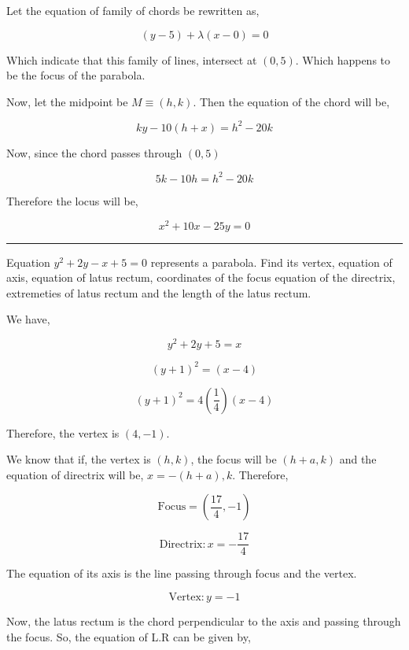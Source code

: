\documentclass[twocolumn]{article}
\begin{document}
\begin{CJK*}{UTF8}{gbsn}
Let the equation of family of chords be rewritten as, 

\[
    (y-5)+ \lambda (x - 0) = 0
\]

Which indicate that this family of lines, intersect at \((0, 5)\). Which happens to be the focus of the parabola.

\vspace*{0.1in}

Now, let the midpoint be \(M \equiv (h, k)\). Then the equation of the chord will be,  

\[
    ky - 10(h + x) = h^{2} - 20k
\]

Now, since the chord passes through \((0, 5)\) 

\[
    5k - 10h  = h^{2} - 20k
\]

Therefore the locus will be, 

\[
    \boxed{x^{2} + 10x - 25y = 0}
\]

\hrule 

\begin{question}
    Equation \(y^{2} + 2y - x + 5 = 0\)  represents a parabola. Find its vertex, equation of axis, equation of latus rectum, coordinates of the focus equation of the directrix, extremeties of latus rectum and the length of the latus rectum.  
\end{question}

We have, 

\[
    y^{2}  + 2y + 5 = x
\]

\[
    (y+  1)^{2} = (x-4)
\]

\[
    (y + 1)^{2} = 4 (\frac{1}{4}) (x-4)
\]

Therefore, the vertex is \(\boxed{(4, -1)}\). 

\vspace*{0.1in}

We know that if, the vertex is \((h, k)\), the focus will be \((h + a, k)\) and the equation of directrix will be, \(x = -(h+a), k\). Therefore, 

\[
    \text{Focus}  = \boxed{(\frac{17}{4}, -1)}
\]

\[
    \text{Directrix} : \boxed{x = -\frac{17}{4}}
\]

The equation of its axis is the line passing through focus and the vertex. 

\[
    \text{Vertex} : \boxed{y = -1}
\]

Now, the latus rectum is the chord perpendicular to the axis and passing through the focus. So, the equation of L.R can be given by, 


\end{CJK*}
\end{document}
